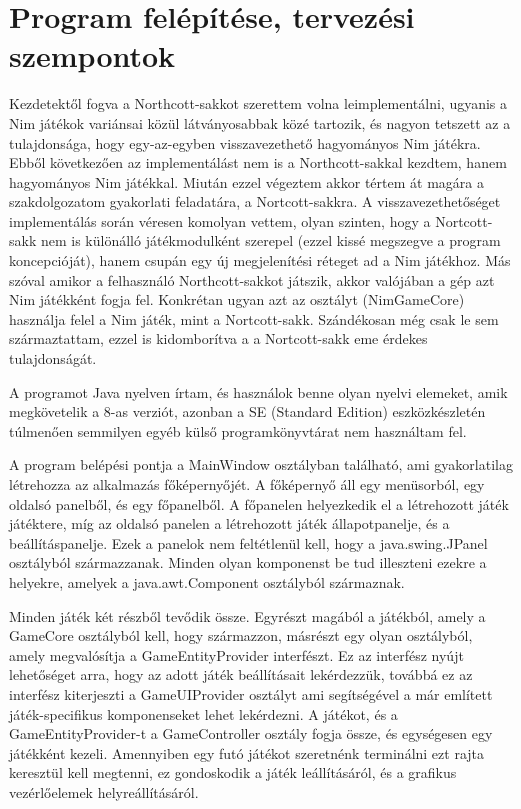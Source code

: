 \section{Program felépítése, tervezési szempontok} \label{section:implementation_design}
Kezdetektől fogva a Northcott-sakkot szerettem volna leimplementálni, ugyanis a Nim játékok variánsai közül látványosabbak közé tartozik, és nagyon tetszett az a tulajdonsága, hogy egy-az-egyben visszavezethető hagyományos Nim játékra. Ebből következően az implementálást nem is a Northcott-sakkal kezdtem, hanem hagyományos Nim játékkal. Miután ezzel végeztem akkor tértem át magára a szakdolgozatom gyakorlati feladatára, a Nortcott-sakkra. A visszavezethetőséget implementálás során véresen komolyan vettem, olyan szinten, hogy a Nortcott-sakk nem is különálló játékmodulként szerepel (ezzel kissé megszegve a program koncepcióját), hanem csupán egy új megjelenítési réteget ad a Nim játékhoz. Más szóval amikor a felhasználó Northcott-sakkot játszik, akkor valójában a gép azt Nim játékként fogja fel. Konkrétan ugyan azt az osztályt (NimGameCore) használja felel a Nim játék, mint a Nortcott-sakk. Szándékosan még csak le sem származtattam, ezzel is kidomborítva a a Nortcott-sakk eme érdekes tulajdonságát.\ujsor

A programot Java nyelven írtam, és használok benne olyan nyelvi elemeket, amik megkövetelik a 8-as verziót, azonban a SE (Standard Edition) eszközkészletén túlmenően semmilyen egyéb külső programkönyvtárat nem használtam fel.\ujsor

A program belépési pontja a MainWindow osztályban található, ami gyakorlatilag létrehozza az alkalmazás főképernyőjét. A főképernyő áll egy menüsorból, egy oldalsó panelből, és egy főpanelből. A főpanelen helyezkedik el a létrehozott játék játéktere, míg az oldalsó panelen a létrehozott játék állapotpanelje, és a beállításpanelje. Ezek a panelok nem feltétlenül kell, hogy a java.swing.JPanel osztályból származzanak. Minden olyan komponenst be tud illeszteni ezekre a helyekre, amelyek a java.awt.Component osztályból származnak.\ujsor

Minden játék két részből tevődik össze. Egyrészt magából a játékból, amely a GameCore osztályból kell, hogy származzon, másrészt egy olyan osztályból, amely megvalósítja a GameEntityProvider interfészt. Ez az interfész nyújt lehetőséget arra, hogy az adott játék beállításait lekérdezzük, továbbá ez az interfész kiterjeszti a GameUIProvider osztályt ami segítségével a már említett játék-specifikus komponenseket lehet lekérdezni. A játékot, és a GameEntityProvider-t a GameController osztály fogja össze, és egységesen egy játékként kezeli. Amennyiben egy futó játékot szeretnénk terminálni ezt rajta keresztül kell megtenni, ez gondoskodik a játék leállításáról, és a grafikus vezérlőelemek helyreállításáról.\ujsor

